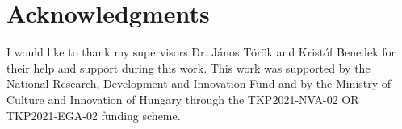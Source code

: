 \documentclass[a4paper,12pt]{article}
\begin{document}




\section{Acknowledgments }
\label{sec:acknowledgements}

I would like to thank my supervisors Dr. János Török and Kristóf Benedek for their help and support during this work. This work was supported by the National Research, Development and Innovation Fund and by the Ministry of Culture and Innovation of Hungary through the TKP2021-NVA-02 OR TKP2021-EGA-02 funding scheme.
\end{document}
